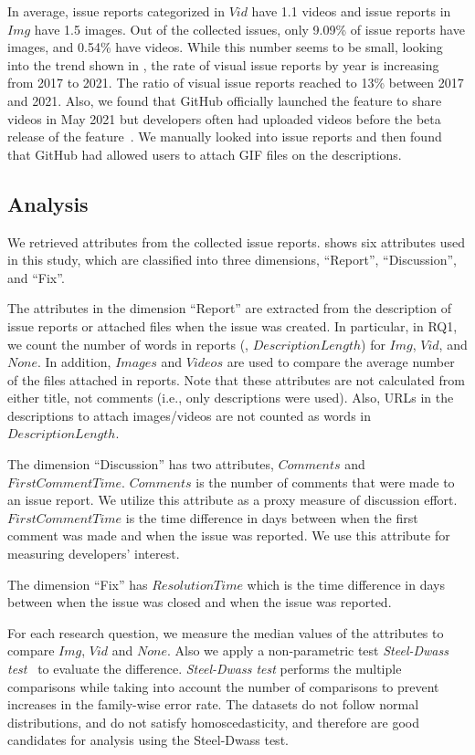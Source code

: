 
In average, issue reports categorized in $Vid$ have 1.1 videos and issue reports in $Img$ have 1.5 images.  
Out of the collected issues, only 9.09\% of issue reports have images, and 0.54\% have videos. 
While this number seems to be small, looking into the trend shown in , the rate of visual issue reports by year is increasing from 2017 to 2021. 
The ratio of visual issue reports reached to 13\% between 2017 and 2021. 
Also, we found that GitHub officially launched the feature to share videos in May 2021 but developers often had uploaded videos before the beta release of the feature~\citep{github-video-blog-beta}. 
We manually looked into issue reports and then found that GitHub had allowed users to attach GIF files on the descriptions.

% 
%

\subsection{Analysis}
 We retrieved attributes from the collected issue reports.  shows six attributes used in this study, which are classified into three dimensions, ``Report'', ``Discussion'', and ``Fix''. 

The attributes in the dimension ``Report'' are extracted from the description of issue reports or attached files when the issue was created. 
In particular, in RQ1, we count the number of words in reports (\ie, $DescriptionLength$) for $Img$, $Vid$, and $None$. 
In addition,  $Images$ and $Videos$ are used to compare the average number of the files attached in reports. 
Note that these attributes are not calculated from either title, not comments (i.e., only descriptions were used). Also, URLs in the descriptions to attach images/videos are not counted as words in $DescriptionLength$.

The dimension ``Discussion'' has two attributes, $Comments$ and $FirstCommentTime$. 
$Comments$ is the number of comments that were made to an issue report. 
We utilize this attribute as a proxy measure of discussion effort. $FirstCommentTime$ is the time difference in days between when the first comment was made and when the issue was reported. 
We use this attribute for measuring developers' interest. 

The dimension ``Fix'' has $ResolutionTime$ which is the time difference in days between when the issue was closed and when the issue was reported. 

 For each research question, we measure the median values of the attributes to compare $Img$, $Vid$ and $None$. 
Also we apply a non-parametric test \textit{Steel-Dwass test}~\citep{steel-dwass-test} to evaluate the difference. 
\textit{Steel-Dwass test} performs the multiple comparisons while taking into account the number of comparisons to prevent increases in the family-wise error rate.
The datasets do not follow normal distributions, and do not satisfy homoscedasticity, and therefore are good candidates for analysis using the Steel-Dwass test. 
